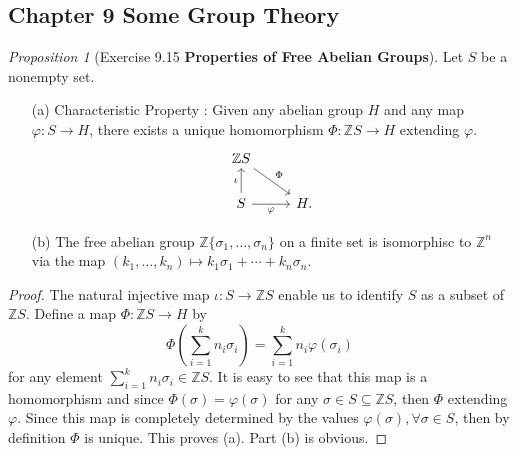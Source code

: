 \documentclass[a4paper]{article}
\theoremstyle{remark}
\newtheorem{prop}{Proposition}
\newcommand{\Z}{\mathbb{Z}} %
\newcommand{\Zn}{\mathbb{Z}^n} %
\newcommand{\subhim}{\subseteq} %
\begin{document}
\subsection*{Chapter 9 Some Group Theory}
\begin{prop}[Exercise 9.15 \textbf{Properties of Free Abelian Groups}]
	Let $S$ be a nonempty set. 
	\begin{itemize}[nolistsep]
		\item[(a)] Characteristic Property : Given any abelian group $H$ and any map $\varphi : S \to H$, there exists a unique homomorphism $\Phi : \Z S \to H$ extending $\varphi$.
		\[
		\begin{tikzcd}
		\Z S \arrow[dr,"\Phi"] & \\
		S \arrow[u,"\iota"] \arrow[r,"\varphi",swap] & H.
		\end{tikzcd}
		\]
		\item[(b)] The free abelian group $\Z \{\sigma_1 ,\dots ,\sigma_n \}$ on a finite set is isomorphisc to $\Zn$ via the map $(k_1,\dots,k_n) \mapsto  k_1 \sigma_1 + \cdots + k_n \sigma_n$.
	\end{itemize}
\end{prop}
\begin{proof}
	The natural injective map $\iota : S \to \Z S$ enable us to identify $S$ as a subset of $\Z S$. Define a map $\Phi : \Z S \to H$ by 
	$$
	\Phi (\sum_{i=1}^k n_i \sigma_i) = \sum_{i=1}^{k} n_i \varphi(\sigma_i) 
	$$
	for any element $ \sum_{i=1}^k n_i \sigma_i \in \Z S$. It is easy to see that this map is a homomorphism and since $\Phi(\sigma) = \varphi(\sigma)$ for any $\sigma \in S \subhim \Z S$, then $\Phi$ extending $\varphi$. Since this map is completely determined by the values $\varphi(\sigma), \forall \sigma \in S$, then by definition $\Phi$ is unique. This proves (a). Part (b) is obvious.  
\end{proof}
\end{document}
